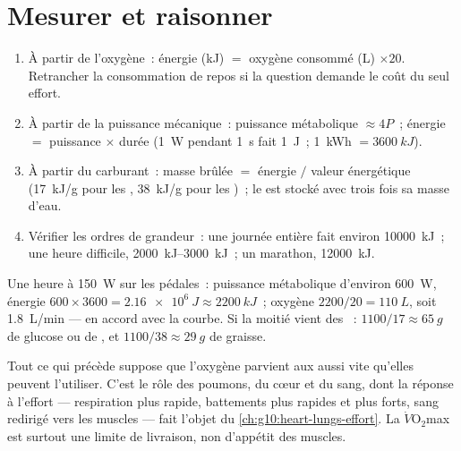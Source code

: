 \section{Mesurer et raisonner}

\begin{method}\label{met:g10:exercise-and-energy:calc}
\begin{enumerate}
  \item À partir de l'oxygène~: énergie (\unit{kJ}) $=$ oxygène
        consommé (\unit{L}) $\times 20$. Retrancher la consommation de
        repos si la question demande le coût du seul effort.
  \item À partir de la puissance mécanique~: puissance métabolique
        $\approx 4 P$~; énergie $=$ puissance $\times$ durée
        (\qty{1}{W} pendant \qty{1}{s} fait \qty{1}{J}~; \qty{1}{kWh}
        $= \qty{3600}{kJ}$).
  \item À partir du carburant~: masse brûlée $=$ énergie $/$ valeur
        énergétique (\qty{17}{kJ/g} pour les , \qty{38}{kJ/g}
        pour les )~; le  est stocké avec trois fois sa
        masse d'eau.
  \item Vérifier les ordres de grandeur~: une journée entière fait
        environ \qty{10000}{kJ}~; une heure difficile,
        \qtyrange{2000}{3000}{kJ}~; un marathon, \qty{12000}{kJ}.
\end{enumerate}
\end{method}

\begin{example}\label{ex:g10:exercise-and-energy:hour}
Une heure à \qty{150}{W} sur les pédales~: puissance métabolique
d'environ \qty{600}{W}, énergie $600 \times 3600 = \qty{2.16e6}{J} \approx
\qty{2200}{kJ}$~; oxygène $2200/20 = \qty{110}{L}$, soit
\qty{1.8}{L/min} --- en accord avec la courbe. Si la moitié vient des
~: $1100/17 \approx \qty{65}{g}$ de glucose ou de , et
$1100/38 \approx \qty{29}{g}$ de graisse.
\end{example}

\begin{remark}\label{rem:g10:exercise-and-energy:delivery}
Tout ce qui précède suppose que l'oxygène parvient aux 
aussi vite qu'elles peuvent l'utiliser. C'est le rôle des poumons, du
cœur et du sang, dont la réponse à l'effort --- respiration plus
rapide, battements plus rapides et plus forts, sang redirigé vers les
muscles --- fait l'objet du \cref{ch:g10:heart-lungs-effort}. La
$\dot V\!\mathrm{O_2}$max est surtout une limite de livraison, non
d'appétit des muscles.
\end{remark}

